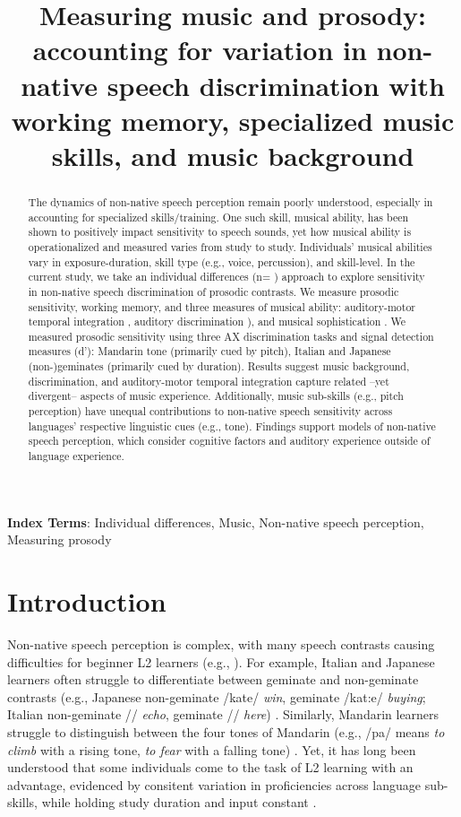 \documentclass[a4paper]{article}
\title{Measuring music and prosody: accounting for variation in non-native speech discrimination with working memory, specialized music skills, and music background}
\newcommand{\livedata}[2]{%
    \DTLfetch{#1}{Statistic}{#2}{Value}%
}
\begin{document}
\maketitle
% 
\begin{abstract}
The dynamics of non-native speech perception remain poorly understood, especially in accounting for specialized skills/training. One such skill, musical ability, has been shown to positively impact sensitivity to speech sounds, yet how musical ability is operationalized and measured varies from study to study. Individuals’ musical abilities vary in exposure-duration, skill type (e.g., voice, percussion), and skill-level. In the current study, we take an individual differences (n=\livedata{partrem}{kept_participants}) approach to explore sensitivity in non-native speech discrimination of prosodic contrasts. We measure prosodic sensitivity, working memory, and three measures of musical ability: auditory-motor temporal integration \cite{Kachlicka_Saito_Tierney_2019}, auditory discrimination \cite[MET]{Wallentin_Nielsen_Friis-Olivarius_Vuust_Vuust_2010}), and musical sophistication \cite[Goldsmiths-MSI]{Müllensiefen_Gingras_Musil_Stewart_2014}. We measured prosodic sensitivity using three AX discrimination tasks and signal detection measures (d'): Mandarin tone (primarily cued by pitch), Italian and Japanese (non-)geminates (primarily cued by duration). Results suggest music background, discrimination, and auditory-motor temporal integration capture related –yet divergent– aspects of music experience. Additionally, music sub-skills (e.g., pitch perception) have unequal contributions to non-native speech sensitivity across languages' respective linguistic cues (e.g., tone). Findings support models of non-native speech perception, which consider cognitive factors and auditory experience outside of language experience.

\end{abstract}
\noindent\textbf{Index Terms}:  Individual differences, Music, Non-native speech perception, Measuring prosody
\noindent\section{Introduction}

Non-native speech perception is complex, with many speech contrasts causing difficulties for beginner L2 learners (e.g., \cite{Flege_95,Flege_2021}). For example, Italian and Japanese learners often struggle to differentiate between geminate and non-geminate contrasts (e.g., Japanese non-geminate /kate/ \textit{win}, geminate /kat:e/ \textit{buying}; Italian non-geminate // \textit{echo}, geminate // \textit{here}) \cite{Tsukada_Cox_Hajek_Hirata_2017}. Similarly, Mandarin learners struggle to distinguish between the four tones of Mandarin (e.g., /pa/ means \emph{to climb} with a rising tone, \emph{to fear} with a falling tone)  \cite{Pelzl_2021}. Yet, it has long been understood that some individuals come to the task of L2 learning with an advantage, evidenced by consitent variation in proficiencies across language sub-skills, while holding study duration and input constant \cite{Zheng_2021}. 
\end{document}
